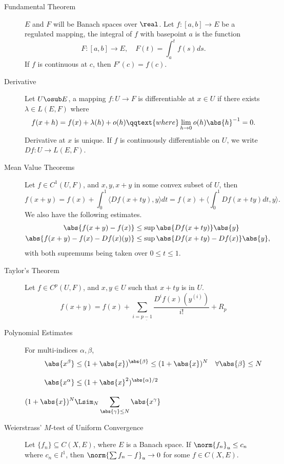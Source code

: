 \documentclass[../main-v2-manifolds.tex]{subfiles}
\begin{document}
\providecommand{\ek}{e^{2\pi k J t}}
\providecommand{\Grom}{\mathrm{Gromov}}
\providecommand{\Periodic}{\mathrm{Periodic}}
\providecommand{\frakc}{\mathcal{C}}
\providecommand{\frakco}{\mathcal{C}_0}
\providecommand{\hcal}{\mathcal{H}}
\providecommand{\hcala}{\mathcal{H}_a}
\providecommand{\osc}{\mathrm{osc}}
\graphicspath{{../images/}{images/}} 


\begin{description}
    \item[Fundamental Theorem]
    $E$ and $F$ will be Banach spaces over $\real$. Let $f:[a,b]\to E$ be a regulated mapping, the integral of $f$ with basepoint $a$ is the function 
\[
    F:[a,b]\to E,\quad F(t) = \int_a^t f(s)ds.
\]
If $f$ is continuous at $c$, then $F'(c) = f(c)$. 
\item[Derivative]
Let $U\osub E$, a mapping $f:U\to F$ is differentiable at $x\in U$ if there exists $\lambda\in L(E,F)$ where
    \[
        f(x+h) = f(x) + \lambda(h) + o(h)\qqtext{where}\lim_{h\to 0}o(h)\abs{h}^{-1} = 0.
    \]
    Derivative at $x$ is unique. If $f$ is continuously differentiable on $U$, we write $Df: U\to L(E,F)$.
    \item[Mean Value Theorems]
    Let $f\in C^1(U,F)$, and $x,y, x+y$ in some convex subset of $U$, then
    \[
        f(x+y) = f(x) +\int_0^1 \langle Df(x + ty), y\rangle dt = f(x) + \langle\int_0^1 Df(x + ty)dt, y\rangle.
    \]
    We also have the following estimates.
    \begin{align*}
        \abs{f(x+y) - f(x)} &\leq \sup\abs{Df(x+ty)}\abs{y}\\
        \abs{f(x+y) - f(x) - Df(x)(y)} &\leq \sup\abs{Df(x + ty) - Df(x)}\abs{y},
    \end{align*}
    with both supremums being taken over $0\leq t\leq 1$.
    \item[Taylor's Theorem]
    Let $f\in C^p(U,F)$, and $x,y\in U$ such that $x+ty$ is in $U$. 
    \[
        f(x+y) = f(x) + \sum_{i=\underline{p-1}}\dfrac{D^{i}f(x)(y^{(i)})}{i!} + R_p
    \]
    \item[Polynomial Estimates]
    For multi-indices $\alpha,\beta$,
    \begin{align*}
        \abs{x^\beta}&\leq (1+\abs{x})^{\abs{\beta}}\leq (1+\abs{x})^N\quad\forall \abs{\beta}\leq N\\[2ex]
        \abs{x^\alpha}&\leq (1+\abs{x}^2)^{\abs{\alpha}/2}\\[2ex]
        (1+\abs{x})^N&\Lsim_{N}\sum_{\abs{\gamma}\leq N}\abs{x^\gamma}
    \end{align*}
    \item[Weierstrass' $M$-test of Uniform Convergence]
    Let $\{f_n\}\subseteq C(X,E)$, where $E$ is a Banach space. If $\norm{f_n}_u\leq c_n$ where $c_n\in l^1$, then $\norm{\sum f_n-f}_u\to 0$ for some $f\in C(X,E)$.
    \end{description}
\end{document}
